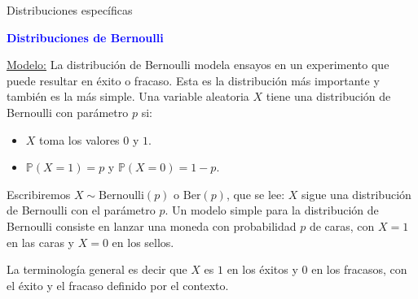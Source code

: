 \documentclass[10pt]{beamer}
\begin{document}
\begin{frame}{Distribuciones espec\'ificas}
	
\textbf{\textcolor{blue}{Distribuciones de Bernoulli}}

\underline{Modelo:}  La distribuci\'on de Bernoulli modela ensayos  en un experimento que puede resultar en \'exito o fracaso. Esta es la distribuci\'on m\'as importante y tambi\'en es la m\'as simple. Una variable aleatoria $X$ tiene una distribuci\'on de Bernoulli con  par\'ametro $p$ si:

\begin{itemize}
	\item $X$ toma los valores $0$ 	y $1$.
	\item $\mathbb{P}(X = 1) = p$ y $\mathbb{P}(X = 0 ) = 1- p$.
\end{itemize}


\vspace{0.5cm}


\scriptsize{Escribiremos $X \sim \text{Bernoulli}(p)$ o $\text{Ber}(p)$, que se lee: $X$ sigue una distribuci\'on de Bernoulli con el par\'ametro $p$. Un modelo simple para la distribuci\'on de Bernoulli consiste en lanzar  una moneda con probabilidad $p$ de caras, con $X = 1$ en las caras y $X = 0$ en los sellos. 
	
La terminolog\'ia general es decir que  $X$ es $1$ en los \'exitos y $0$ en los fracasos, con el \'exito y el fracaso definido por el contexto.
}
\end{frame}
\end{document}
